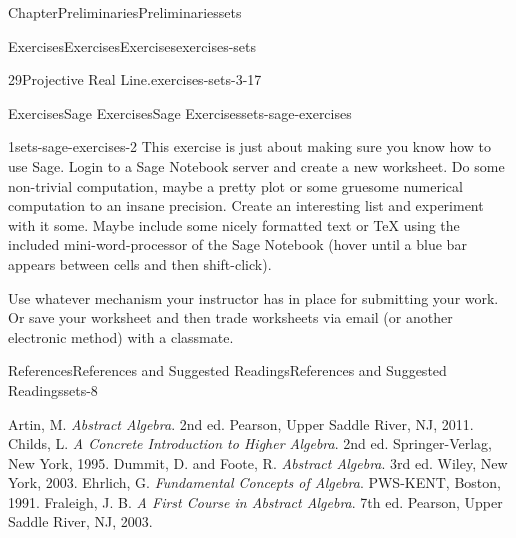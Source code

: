 \documentclass[oneside,10pt,]{book}
\numberwithin{equation}{section}
\begin{document}
\begin{chapterptx}{Chapter}{Preliminaries}{}{Preliminaries}{}{}{sets}
\begin{exercises-section}{Exercises}{Exercises}{}{Exercises}{}{}{exercises-sets}
\begin{divisionexercise}{29}{Projective Real Line.}{}{exercises-sets-3-17}
\end{divisionexercise}%
\end{exercises-section}
%
%
\typeout{************************************************}
\typeout{************************************************}
%
\begin{exercises-section}{Exercises}{Sage Exercises}{}{Sage Exercises}{}{}{sets-sage-exercises}
\begin{divisionexercise}{1}{}{}{sets-sage-exercises-2}%
This exercise is just about making sure you know how to use Sage.  Login to a Sage Notebook server and create a new worksheet.  Do some non-trivial computation, maybe a pretty plot or some gruesome numerical computation to an insane precision.   Create an interesting list and experiment with it some.  Maybe include some nicely formatted text or \TeX{} using the included mini-word-processor of the Sage Notebook (hover until a blue bar appears between cells and then shift-click).%
\par
Use whatever mechanism your instructor has in place for submitting your work.  Or save your worksheet and then trade worksheets via email (or another electronic method) with a classmate.%
\end{divisionexercise}%
\end{exercises-section}
%
%
\typeout{************************************************}
\typeout{************************************************}
%
\begin{references-section}{References}{References and Suggested Readings}{}{References and Suggested Readings}{}{}{sets-8}
\begin{referencelist}
\hypertarget{sets-8-2}{}  Artin, M. \textit{Abstract Algebra}. 2nd ed. Pearson, Upper Saddle River, NJ, 2011.
\hypertarget{sets-8-3}{}  Childs, L. \textit{A Concrete Introduction to Higher Algebra}. 2nd ed. Springer-Verlag, New York, 1995.
\hypertarget{sets-8-4}{}  Dummit, D. and Foote, R.  \textit{Abstract Algebra}. 3rd ed. Wiley, New York, 2003.
\hypertarget{sets-8-5}{}  Ehrlich, G. \textit{Fundamental Concepts of Algebra}. PWS-KENT, Boston, 1991.
\hypertarget{sets-8-6}{}  Fraleigh, J. B. \textit{A First Course in Abstract Algebra}. 7th ed. Pearson, Upper Saddle River, NJ, 2003.

\end{referencelist}
\end{references-section}
\end{chapterptx}
\end{document}
